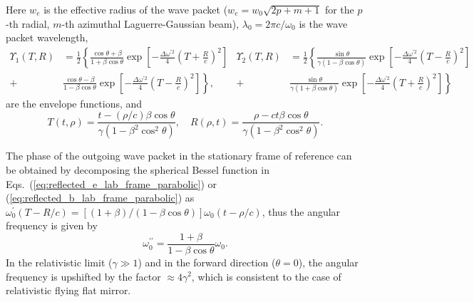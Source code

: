 \documentclass[10pt, a4paper, twoside, openright]{report}
\begin{document}
Here $ w_e $ is the effective radius of the wave packet ($ w_e = w_0 \sqrt{2p + m + 1}$ for the $ p $-th radial, $ m $-th azimuthal Laguerre-Gaussian beam), $ \lambda_0 = 2 \pi c / \omega_0 $ is the wave packet wavelength,
\begin{subequations}
\begin{equation}\label{eq:envelope_function_1}
\begin{aligned}
\Upsilon_1 \left(T, R \right) & = \frac{1}{2} \left\lbrace \frac{\cos \theta + \beta}{1 + \beta \cos \theta} \exp \left[- \frac{\Delta \omega^{\prime 2}}{4} \left( T + \frac{R}{c} \right)^2 \right] \right. \\
+ & \left. \frac{\cos \theta - \beta}{1 - \beta \cos \theta} \exp \left[- \frac{\Delta \omega^{\prime 2}}{4} \left( T - \frac{R}{c} \right)^2 \right] \right\rbrace,
\end{aligned}
\end{equation}
\begin{equation}\label{eq:envelope_function_2}
\begin{aligned}
\Upsilon_2 \left(T, R \right) & = \frac{1}{2} \left\lbrace \frac{\sin \theta}{\gamma \left( 1 - \beta \cos \theta \right) } \exp \left[- \frac{\Delta \omega^{\prime 2}}{4} \left( T - \frac{R}{c} \right)^2 \right] \right. \\
+ & \left. \frac{\sin \theta}{\gamma \left( 1 + \beta \cos \theta \right) } \exp \left[- \frac{\Delta \omega^{\prime 2}}{4} \left( T + \frac{R}{c} \right)^2 \right] \right\rbrace
\end{aligned}
\end{equation}
\end{subequations}
are the envelope functions, and
\begin{equation}\label{eq:T_and_R}
T \left(t, \rho \right) = \frac{t - \left(\rho / c\right) \beta \cos \theta}{\gamma \left( 1 - \beta^2 \cos^2 \theta \right)}, \quad R \left(\rho, t \right) = \frac{\rho - c t \beta \cos \theta}{\gamma \left( 1 - \beta^2 \cos^2 \theta \right)}.
\end{equation}

The phase of the outgoing wave packet in the stationary frame of reference can be obtained by decomposing the spherical Bessel function in Eqs.~(\ref{eq:reflected_e_lab_frame_parabolic}) or (\ref{eq:reflected_b_lab_frame_parabolic}) as $ \omega_0^{\prime} \left( T - R / c \right) = \left[ \left( 1 + \beta \right) / \left( 1 - \beta \cos \theta \right) \right] \omega_0 \left( t - \rho / c \right) $, thus the angular frequency is given by
\begin{equation}\label{key}
	\omega_0^{\prime \prime} = \frac{1 + \beta}{1 - \beta \cos \theta} \omega_0.
\end{equation}
In the relativistic limit ($ \gamma \gg 1 $) and in the forward direction ($ \theta = 0 $), the angular frequency is upshifted by the factor $ \approx 4 \gamma^2 $, which is consistent to the case of relativistic flying flat mirror.
\end{document}
